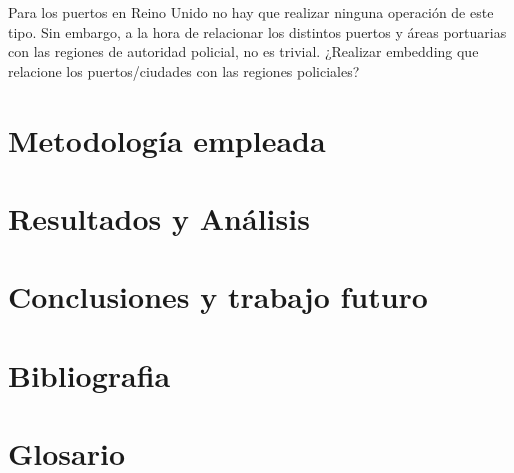 \documentclass{article}
\begin{document}
Para los puertos en Reino Unido no hay que realizar ninguna operación de este tipo. Sin embargo, a la hora de relacionar los distintos puertos y áreas portuarias con las regiones de autoridad policial, no es trivial. ¿Realizar embedding que relacione los puertos/ciudades con las regiones policiales?

\section{Metodología empleada}

\section{Resultados y Análisis}

\section{Conclusiones y trabajo futuro}

\section{Bibliografia}

\section{Glosario}
\end{document}

